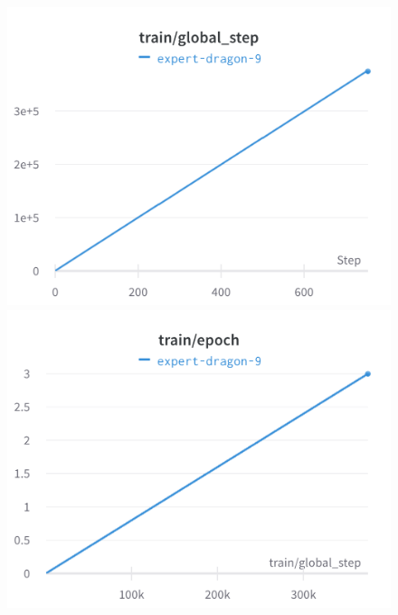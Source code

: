 \documentclass{article}
\begin{document}
\begin{figure}[!htb]
\includegraphics[width=\linewidth]{charts/Section-4-Panel-2-joryegvx8}
\caption{}
\endminipage\hfill
{}
\includegraphics[width=\linewidth]{charts/Section-4-Panel-3-lyc2vnfgn}
\caption{}
\endminipage
\end{figure}
\end{document}
